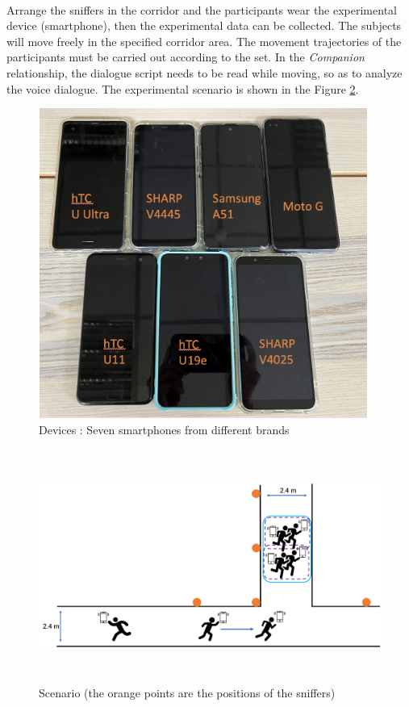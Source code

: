 \documentclass[a4paper,12pt]{report}
\begin{document}
\paragraph{}
Arrange the sniffers in the corridor and the participants wear the experimental device (smartphone), then the experimental data can be collected. The subjects will move freely in the specified corridor area. The movement trajectories of the participants must be carried out according to the set. In the \emph{Companion} relationship, the dialogue script needs to be read while moving, so as to analyze the voice dialogue. The experimental scenario is shown in the Figure \ref{f:Experimental_Setup_Scenario}.
\begin{figure}[btph]
\begin{center}
\includegraphics[width=4.25in,height=4in]{images and data/Experimental_Setup_Devices_Yun.png}
\caption{Devices : Seven smartphones from different brands }
\label{f:Experimental_Setup_Devices}
\end{center}
\end{figure}
\begin{figure}[btph]
\begin{center}
\includegraphics[width=6.3in,height=3in]{images and data/Experimental_Setup_Scenario_Yun.png}
\caption{Scenario (the orange points are the positions of the sniffers)}
\label{f:Experimental_Setup_Scenario}
\end{center}
\end{figure}
\end{document}
